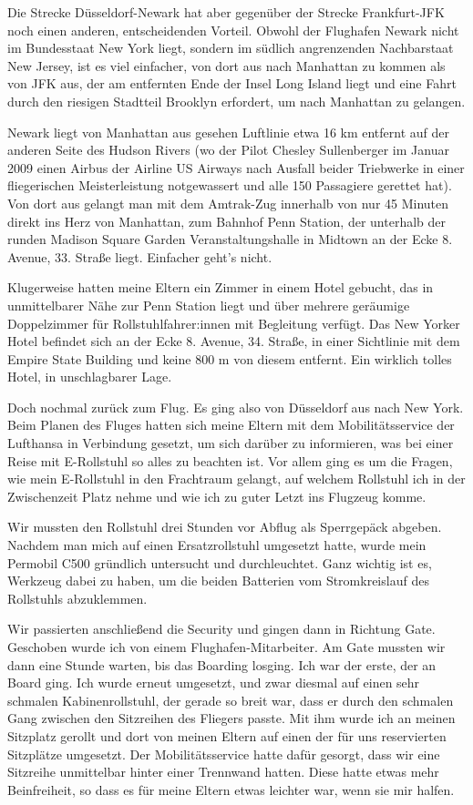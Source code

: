 \documentclass[fontsize=14pt,a4paper,headinclude,DIV=calc,automark]{scrbook}
\begin{document}
Die Strecke Düsseldorf-Newark hat aber gegenüber der Strecke Frankfurt-JFK noch einen anderen, entscheidenden Vorteil. Obwohl der Flughafen Newark nicht im Bundesstaat New York liegt, sondern im südlich angrenzenden Nachbarstaat New Jersey, ist es viel einfacher, von dort aus nach Manhattan zu kommen als von JFK aus, der am entfernten Ende der Insel Long Island liegt und eine Fahrt durch den riesigen Stadtteil Brooklyn erfordert, um nach Manhattan zu gelangen.

Newark liegt von Manhattan aus gesehen Luftlinie etwa 16 km entfernt auf der anderen Seite des Hudson Rivers (wo der Pilot Chesley Sullenberger im Januar 2009 einen Airbus der Airline US Airways nach Ausfall beider Triebwerke in einer fliegerischen Meisterleistung notgewassert und alle 150 Passagiere gerettet hat). Von dort aus gelangt man mit dem Amtrak-Zug innerhalb von nur 45 Minuten direkt ins Herz von Manhattan, zum Bahnhof Penn Station, der unterhalb der runden Madison Square Garden Veranstaltungshalle in Midtown an der Ecke 8. Avenue, 33. Straße liegt. Einfacher geht’s nicht.

Klugerweise hatten meine Eltern ein Zimmer in einem Hotel gebucht, das in unmittelbarer Nähe zur Penn Station liegt und über mehrere geräumige Doppelzimmer für Rollstuhlfahrer:innen mit Begleitung verfügt. Das New Yorker Hotel befindet sich an der Ecke 8. Avenue, 34. Straße, in einer Sichtlinie mit dem Empire State Building und keine 800 m von diesem entfernt. Ein wirklich tolles Hotel, in unschlagbarer Lage.

Doch nochmal zurück zum Flug. Es ging also von Düsseldorf aus nach New York. Beim Planen des Fluges hatten sich meine Eltern mit dem Mobilitätsservice der Lufthansa in Verbindung gesetzt, um sich darüber zu informieren, was bei einer Reise mit E-Rollstuhl so alles zu beachten ist. Vor allem ging es um die Fragen, wie mein E-Rollstuhl in den Frachtraum gelangt, auf welchem Rollstuhl ich in der Zwischenzeit Platz nehme und wie ich zu guter Letzt ins Flugzeug komme.

Wir mussten den Rollstuhl drei Stunden vor Abflug als Sperrgepäck abgeben. Nachdem man mich auf einen Ersatzrollstuhl umgesetzt hatte, wurde mein Permobil C500 gründlich untersucht und durchleuchtet. Ganz wichtig ist es, Werkzeug dabei zu haben, um die beiden Batterien vom Stromkreislauf des Rollstuhls abzuklemmen.

Wir passierten anschließend die Security und gingen dann in Richtung Gate. Geschoben wurde ich von einem Flughafen-Mitarbeiter. Am Gate mussten wir dann eine Stunde warten, bis das Boarding losging. Ich war der erste, der an Board ging. Ich wurde erneut umgesetzt, und zwar diesmal auf einen sehr schmalen Kabinenrollstuhl, der gerade so breit war, dass er durch den schmalen Gang zwischen den Sitzreihen des Fliegers passte. Mit ihm wurde ich an meinen Sitzplatz gerollt und dort von meinen Eltern auf einen der für uns reservierten Sitzplätze umgesetzt. Der Mobilitätsservice hatte dafür gesorgt, dass wir eine Sitzreihe unmittelbar hinter einer Trennwand hatten. Diese hatte etwas mehr Beinfreiheit, so dass es für meine Eltern etwas leichter war, wenn sie mir halfen.
\end{document}
